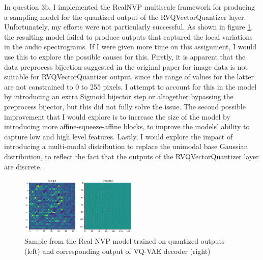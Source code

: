 \documentclass[11pt,a4paper]{article}
\begin{document}
In question 3b, I implemented the RealNVP multiscale framework for producing
a sampling model for the quantized output of the RVQVectorQuantizer layer. 
Unfortunately, my efforts were not particularly successful. As shown
in figure \ref{fig:spectrogam_digit}, the resulting model failed to
produce outputs that captured the local variations in the audio spectrograms.
If I were given more time on this assignment, I would use this to explore the
possible causes for this. Firstly, it is apparent that the data preprocess
bijection suggested in the original paper for image data is not suitable
for RVQVectorQuantizer output, since the range of values for the latter are not
constrained to 0 to 255 pixels. I attempt to account for this in the model by introducing
an extra Sigmoid bijector step or altogether bypassing the preprocess bijector, but this did
not fully solve the issue. The second possible improvement that I would explore
is to increase the size of the model by introducing more affine-squeeze-affine blocks,
to improve the models' ability to capture low and high level features. Lastly,
I would explore the impact of introducing a multi-modal distribution to replace
the unimodal base Gaussian distribution, to reflect the fact that the outputs of
the RVQVectorQuantizer layer are discrete.

\begin{figure}[h]
    \centering
    \includegraphics[width=0.5\textwidth]{../figures/spectrogram_sample_0_cropped.png}
    \caption{Sample from the Real NVP model trained on quantized outputs (left) and corresponding output of VQ-VAE decoder (right)}
    \label{fig:spectrogam_digit}
\end{figure}



\printbibliography
\end{document}
